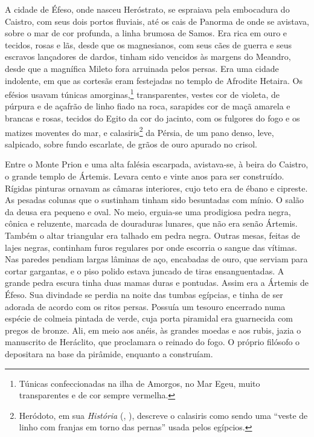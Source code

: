 A cidade de Éfeso, onde nasceu Heróstrato, se espraiava pela embocadura do
Caistro, com seus dois portos fluviais, até os cais de Panorma de onde se
avistava, sobre o mar de cor profunda, a linha brumosa de Samos. Era rica
em ouro e tecidos, rosas e lãs, desde que os magnesianos, com seus cães de
guerra e seus escravos lançadores de dardos, tinham sido vencidos às
margens do Meandro, desde que a magnífica Mileto fora arruinada pelos
persas. Era uma cidade indolente, em que as cortesãs eram festejadas no
templo de Afrodite Hetaira. Os efésios usavam túnicas amorginas,\footnote{
Túnicas confeccionadas na ilha de Amorgos, no Mar Egeu, muito
transparentes e de cor sempre vermelha.} transparentes, vestes
cor de violeta, de púrpura e de açafrão de linho fiado na roca, sarapides
cor de maçã amarela e brancas e rosas, tecidos do Egito da cor do jacinto,
com os fulgores do fogo e os matizes moventes do mar, e
calasiris\footnote{ Heródoto, em sua \textit{História} (, ),
descreve o calasiris como sendo uma “veste de linho com franjas em torno
das pernas” usada pelos egípcios.} da Pérsia, de um pano denso,
leve, salpicado, sobre fundo escarlate, de grãos de ouro apurado no
crisol.

Entre o Monte Prion e uma alta falésia escarpada, avistava-se, à beira do
Caistro, o grande templo de Ártemis. Levara cento e vinte anos para ser
construído. Rígidas pinturas ornavam as câmaras interiores, cujo teto era
de ébano e cipreste. As pesadas colunas que o sustinham tinham sido
besuntadas com mínio. O salão da deusa era pequeno e oval. No meio,
erguia-se uma prodigiosa pedra negra, cônica e reluzente, marcada de
douraduras lunares, que não era senão Ártemis. Também o altar triangular
era talhado em pedra negra. Outras mesas, feitas de lajes negras,
continham furos regulares por onde escorria o sangue das vítimas. Nas
paredes pendiam largas lâminas de aço, encabadas de ouro, que serviam para
cortar gargantas, e o piso polido estava juncado de tiras ensanguentadas.
A grande pedra escura tinha duas mamas duras e pontudas. Assim era a
Ártemis de Éfeso. Sua divindade se perdia na noite das tumbas egípcias, e
tinha de ser adorada de acordo com os ritos persas. Possuía um tesouro
encerrado numa espécie de colmeia pintada de verde, cuja porta piramidal
era guarnecida com pregos de bronze. Ali, em meio aos anéis, às grandes
moedas e aos rubis, jazia o manuscrito de Heráclito, que proclamara o
reinado do fogo. O próprio filósofo o depositara na base da pirâmide,
enquanto a construíam.

